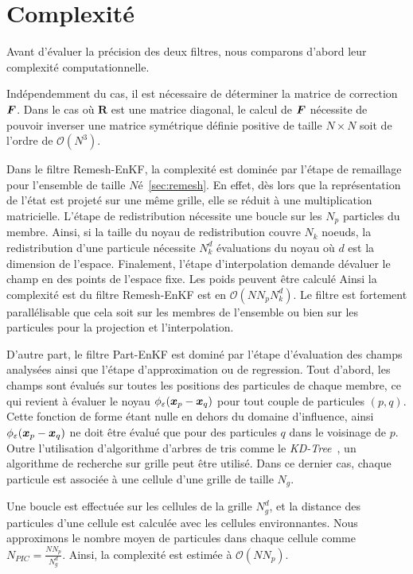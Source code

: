 \section{Complexité}

Avant d'évaluer la précision des deux filtres, nous comparons d'abord leur complexité computationnelle.

Indépendemment du cas, il est nécessaire de déterminer la matrice de correction $\bm{F}$. Dans le cas où $\bm R$ est une matrice diagonal, le calcul de $\bm{F}$ nécessite de pouvoir inverser une matrice symétrique définie positive de taille $N \times N$ soit de l'ordre de $\mathcal O (N^3)$.

Dans le filtre Remesh-EnKF, la complexité est dominée par l'étape de remaillage pour l'ensemble de taille $N$é~\ref{sec:remesh}. En effet, dès lors que la représentation de l'état est projeté sur une même grille, elle se réduit à une multiplication matricielle.
L'étape de redistribution nécessite une boucle sur les $N_p$ particles du membre. Ainsi, si la taille du noyau de redistribution couvre $N_k$ noeuds, la redistribution d'une particule nécessite $N_k^d$ évaluations du noyau où $d$ est la dimension de l'espace. Finalement, l'étape d'interpolation demande dévaluer le champ en des points de l'espace fixe. Les poids peuvent être calculé Ainsi la complexité est du filtre Remesh-EnKF est en $\mathcal{O} (NN_pN_k^d)$. Le filtre est fortement parallélisable que cela soit sur les membres de l'ensemble ou bien sur les particules pour la projection et l'interpolation.

D'autre part, le filtre Part-EnKF est dominé par l'étape d'évaluation des champs analysées ainsi que l'étape d'approximation ou de regression. Tout d'abord, les champs sont évalués sur toutes les positions des particules de chaque membre, ce qui revient à évaluer le noyau $\phi_\varepsilon(\bm{x}_p -\bm{x}_q)$ pour tout couple de particules $(p, q)$. Cette fonction de forme étant nulle en dehors du domaine d'influence, ainsi $\phi_\varepsilon(\bm{x}_p -\bm{x}_q)$ ne doit être évalué que pour des particules $q$ dans le voisinage de $p$. Outre l'utilisation d'algorithme d'arbres de tris comme le \textit{KD-Tree}~\cite{bentley_1975_kdtree}, un algorithme de recherche sur grille peut être utilisé. Dans ce dernier cas, chaque particule est associée à une cellule d'une grille de taille $N_g$.

Une boucle est effectuée sur les cellules de la grille $N_g^d$, et la distance des particules d'une cellule est calculée avec les cellules environnantes. Nous approximons le nombre moyen de particules dans chaque cellule comme $N_{PIC} = \frac{NN_p}{N_g^d}$. Ainsi, la complexité est estimée à $\mathcal{O}(NN_p)$.

